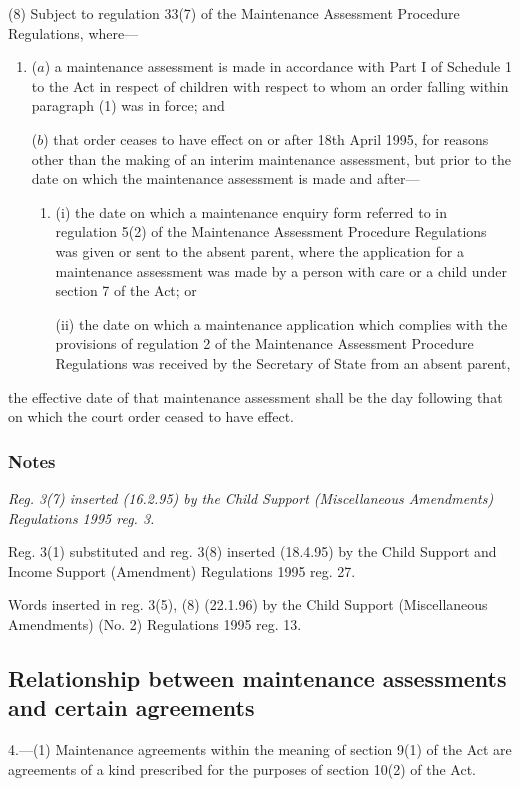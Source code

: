 \documentclass[a4paper]{article}
\newcommand\amendment[1]{\subsubsection*{Notes}{\itshape\frenchspacing\footnotesize #1 \par}}
\begin{document}
(8) 
Subject to regulation 33(7) of the Maintenance Assessment Procedure Regulations,  %
where—
\begin{enumerate}\item[]
($a$) a maintenance assessment is made in accordance with Part I of Schedule 1 to the Act in respect of children with respect to whom an order falling within paragraph (1) was in force; and

($b$) that order ceases to have effect on or after 18th April 1995, for reasons other than the making of an interim maintenance assessment, but prior to the date on which the maintenance assessment is made and after—
\begin{enumerate}\item[]
(i) the date on which a maintenance enquiry form referred to in regulation 5(2) of the Maintenance Assessment Procedure Regulations was given or sent to the absent parent, where the application for a maintenance assessment was made by a person with care or a child under section 7 of the Act; or

(ii) the date on which a maintenance application which complies with the provisions of regulation 2 of the Maintenance Assessment Procedure Regulations was received by the Secretary of State from an absent parent,
\end{enumerate}
\end{enumerate}
the effective date of that maintenance assessment shall be the day following that on which the court order ceased to have effect.

\amendment{
Reg. 3(7) inserted (16.2.95) by the Child Support (Miscellaneous Amendments) Regulations 1995 reg. 3.

Reg. 3(1) substituted and reg. 3(8) inserted (18.4.95) by the Child Support and Income Support (Amendment) Regulations 1995 reg. 27.

Words inserted in reg. 3(5), (8) (22.1.96) by the Child Support (Miscellaneous Amendments) (No. 2) Regulations 1995 reg. 13.
}

\subsection[4. Relationship between maintenance assessments and certain agreements]{\sloppy Relationship between maintenance assessments and certain agreements}

4.—(1) Maintenance agreements within the meaning of section 9(1) of the Act are agreements of a kind prescribed for the purposes of section 10(2) of the Act.
\end{document}
